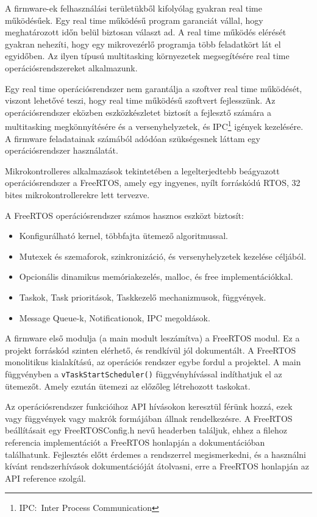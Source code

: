 A firmware-ek felhasználási területükből kifolyólag gyakran real time
működésűek. Egy real time működésű program garanciát vállal, hogy meghatározott
időn belül biztosan választ ad. A real time működés elérését gyakran
nehezíti, hogy egy mikrovezérlő programja több feladatkört lát el egyidőben. Az
ilyen típusú multitasking környezetek megsegítésére real time
operációsrendszereket alkalmazunk.

Egy real time operációsrendszer nem garantálja a szoftver real time működését,
viszont lehetővé teszi, hogy real time működésű szoftvert fejlesszünk. Az
operációsrendszer eközben eszközkészletet biztosít a fejlesztő számára
a multitasking megkönnyítésére és a versenyhelyzetek, és IPC\footnote{IPC:~Inter
Process Communication} igények kezelésére. A firmware feladatainak
számából adódóan szükségesnek láttam egy operációsrendszer használatát.

Mikrokontrolleres alkalmazások tekintetében a legelterjedtebb beágyazott
operációsrendszer a FreeRTOS, amely egy ingyenes, nyílt forráskódú RTOS, 32 bites
mikrokontrollerekre lett tervezve.

A FreeRTOS operációsrendszer számos hasznos eszközt biztosít:

\begin{itemize}
  \setlength\itemsep{0em}
\item{Konfigurálható kernel, többfajta ütemező algoritmussal.}
\item{Mutexek és szemaforok, szinkronizáció, és versenyhelyzetek kezelése
  céljából.}
\item{Opcionális dinamikus memóriakezelés, malloc, és free implementációkkal.}
\item{Taskok, Task prioritások, Taskkezelő mechanizmusok, függvények.}
\item{Message Queue-k, Notificationok, IPC megoldások.}
\end{itemize}

A firmware első modulja (a main modult leszámítva) a FreeRTOS
modul. Ez a projekt forráskód szinten elérhető, és rendkívül jól
dokumentált. A FreeRTOS monolitikus kialakítású, az operációs rendszer
egybe fordul a projektel. A main függvényben a
\verb|vTaskStartScheduler()| függvényhívással indíthatjuk el az
ütemezőt. Amely ezután ütemezi az előzőleg létrehozott taskokat.

Az operációsrendszer funkcióihoz API hívásokon keresztül férünk hozzá,
ezek vagy függvények vagy makrók formájában állnak rendelkezésre. A
FreeRTOS beállításait egy FreeRTOSConfig.h nevű headerben találjuk,
ehhez a filehoz referencia implementációt a FreeRTOS honlapján a
dokumentációban találhatunk. Fejlesztés előtt érdemes a rendszerrel
megismerkedni, és a használni kívánt rendszerhívások dokumentációját
átolvasni, erre a FreeRTOS honlapján az API
reference\cite{FreertosApiReference} szolgál.

